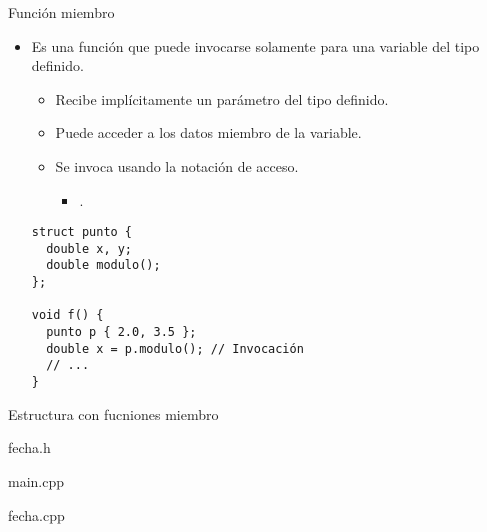 \begin{frame}[fragile]{Función miembro}
\begin{itemize}
  \item Es una función que puede invocarse solamente para una variable del tipo definido.
    \begin{itemize}
      \item Recibe implícitamente un parámetro del tipo definido.
      \item Puede acceder a los datos miembro de la variable.
      \item Se invoca usando la notación de acceso.
        \begin{itemize}
          \item {}.
        \end{itemize}
    \end{itemize}
\begin{lstlisting}
struct punto {
  double x, y;
  double modulo();
};

void f() {
  punto p { 2.0, 3.5 };
  double x = p.modulo(); // Invocación
  // ...
}
\end{lstlisting}
\end{itemize}
\end{frame}

\begin{frame}{Estructura con fucniones miembro}
\begin{block}{fecha.h}

\end{block}
\begin{block}{main.cpp}

\end{block}
\end{frame}

\begin{frame}
\begin{block}{fecha.cpp}
\mode<presentation>{

}
\end{block}
\end{frame}

